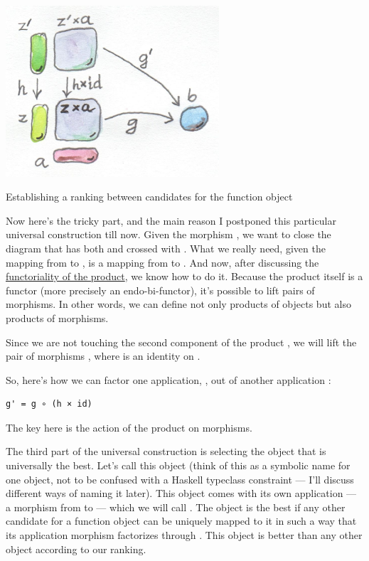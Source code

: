 \hypertarget{attachment_4245}{}
\includegraphics[width=3.12500in]{images/functionranking.jpg}

Establishing a ranking between candidates for the function object

Now here's the tricky part, and the main reason I postponed this
particular universal construction till now. Given the morphism
, we want to close the diagram
that has both  and  crossed with .
What we really need, given the mapping  from 
to , is a mapping from  to .
And now, after discussing the
\href{https://bartoszmilewski.com/2015/02/03/functoriality/}{functoriality
of the product}, we know how to do it. Because the product itself is a
functor (more precisely an endo-bi-functor), it's possible to lift pairs
of morphisms. In other words, we can define not only products of objects
but also products of morphisms.

Since we are not touching the second component of the product
, we will lift the pair of morphisms
, where  is an identity on .

So, here's how we can factor one application, , out of another
application :

\begin{verbatim}
g' = g ∘ (h × id)
\end{verbatim}

The key here is the action of the product on morphisms.

The third part of the universal construction is selecting the object
that is universally the best. Let's call this object  (think
of this as a symbolic name for one object, not to be confused with a
Haskell typeclass constraint --- I'll discuss different ways of naming
it later). This object comes with its own application --- a morphism
from  to  --- which we will call
. The object  is the best if any other
candidate for a function object can be uniquely mapped to it in such a
way that its application morphism  factorizes through
. This object is better than any other object according to
our ranking.

